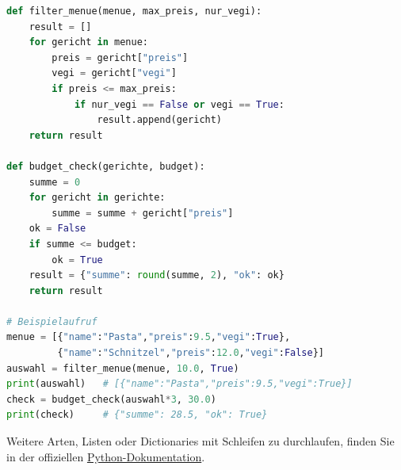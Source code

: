 \begin{myexercise}
	\begin{myanswer}
		\begin{lstlisting}[language=Python]
def filter_menue(menue, max_preis, nur_vegi):
    result = []
    for gericht in menue:
        preis = gericht["preis"]
        vegi = gericht["vegi"]
        if preis <= max_preis:
            if nur_vegi == False or vegi == True:
                result.append(gericht)
    return result

def budget_check(gerichte, budget):
    summe = 0
    for gericht in gerichte:
        summe = summe + gericht["preis"]
    ok = False
    if summe <= budget:
        ok = True
    result = {"summe": round(summe, 2), "ok": ok}
    return result

# Beispielaufruf
menue = [{"name":"Pasta","preis":9.5,"vegi":True},
         {"name":"Schnitzel","preis":12.0,"vegi":False}]
auswahl = filter_menue(menue, 10.0, True)
print(auswahl)   # [{"name":"Pasta","preis":9.5,"vegi":True}]
check = budget_check(auswahl*3, 30.0)
print(check)     # {"summe": 28.5, "ok": True}
\end{lstlisting}
	\end{myanswer}
\end{myexercise}

\begin{myremark}
	Weitere Arten, Listen oder Dictionaries mit Schleifen zu durchlaufen, finden Sie in der offiziellen \href{https://docs.python.org/3/tutorial/datastructures.html#looping-techniques}{Python-Dokumentation}.
\end{myremark}